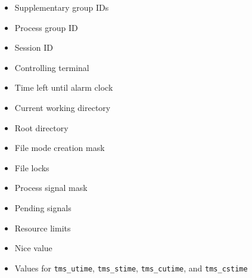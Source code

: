 \documentclass[]{article} \usepackage[all]{xy}
\newcommand{\code}{\texttt}
\begin{document}
\begin{itemize}
\begin{itemize}
\item Supplementary group IDs
\item Process group ID
\item Session ID
\item Controlling terminal
\item Time left until alarm clock
\item Current working directory
\item Root directory
\item File mode creation mask
\item File locks
\item Process signal mask
\item Pending signals
\item Resource limits
\item Nice value
\item Values for \code{tms\_utime}, \code{tms\_stime}, \code{tms\_cutime}, and
\code{tms\_cstime}
\end{itemize}
\end{itemize}
\end{document}
